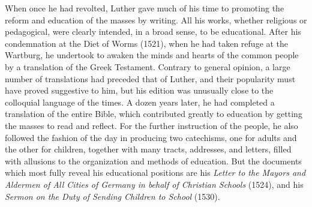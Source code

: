 \documentclass[]{book}
\begin{document}
When once he had revolted, Luther gave much of his time to promoting the reform and education of the masses by writing. All his works, whether religious or pedagogical, were clearly intended, in a broad sense, to be educational. After his condemnation at the Diet of Worms (1521), when he had taken refuge at the Wartburg, he undertook to awaken the minds and hearts of the common people by a translation of the Greek Testament. Contrary to general opinion, a large number of translations had preceded that of Luther, and their popularity must have proved suggestive to him, but his edition was unusually close to the colloquial language of the times. A dozen years later, he had completed a translation of the entire Bible, which contributed greatly to education by getting the masses to read and reflect. For the further instruction of the people, he also followed the fashion of the day in producing two catechisms, one for adults and the other for children, together with many tracts, addresses, and letters, filled with allusions to the organization and methods of education. But the documents which most fully reveal his educational positions are his \emph{Letter to the Mayors and Aldermen of All Cities of Germany in behalf of Christian Schools} (1524), and his \emph{Sermon on the Duty of Sending Children to School} (1530).
\end{document}
